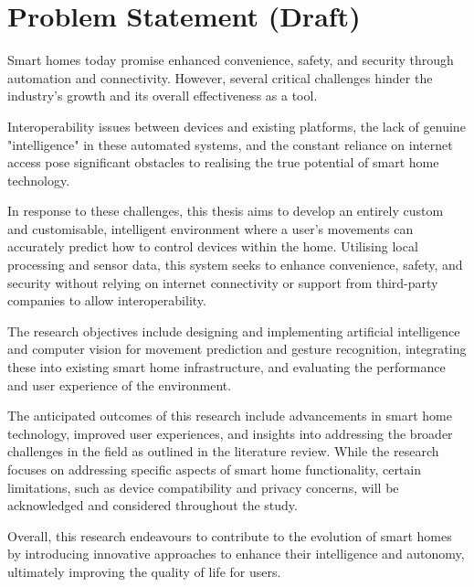 \section{Problem Statement (Draft)}

Smart homes today promise enhanced convenience, safety, and security through automation and connectivity.
However, several critical challenges hinder the industry's growth and its overall effectiveness as a tool.

Interoperability issues between devices and existing platforms, the lack of genuine "intelligence" in these automated systems, and the constant reliance on internet access pose significant obstacles to realising the true potential of smart home technology.

In response to these challenges, this thesis aims to develop an entirely custom and customisable, intelligent environment where a user's movements can accurately predict how to control devices within the home.
Utilising local processing and sensor data, this system seeks to enhance convenience, safety, and security without relying on internet connectivity or support from third-party companies to allow interoperability.

The research objectives include designing and implementing artificial intelligence and computer vision for movement prediction and gesture recognition, integrating these into existing smart home infrastructure, and evaluating the performance and user experience of the environment.

The anticipated outcomes of this research include advancements in smart home technology, improved user experiences, and insights into addressing the broader challenges in the field as outlined in the literature review.
While the research focuses on addressing specific aspects of smart home functionality, certain limitations, such as device compatibility and privacy concerns, will be acknowledged and considered throughout the study.

Overall, this research endeavours to contribute to the evolution of smart homes by introducing innovative approaches to enhance their intelligence and autonomy, ultimately improving the quality of life for users.